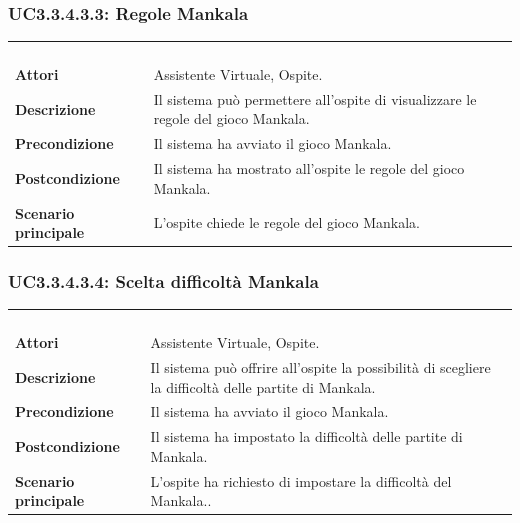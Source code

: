 \subsubsection{UC3.3.4.3.3: Regole Mankala}
\label{UC3.3.4.3.3}
\begin{longtable}{l|p{10cm}}
\rowcolor[gray]{0.8} \multicolumn{2}{c}{} \\
\rowcolor[gray]{0.8} \multicolumn{2}{c}{\textbf{UC3.3.4.3.3 - Regole Mankala}} \\
\rowcolor[gray]{0.8} \multicolumn{2}{c}{} \\
\hline
&\\
\textbf{Attori} & Assistente Virtuale, Ospite.\\[7pt]
\textbf{Descrizione} & Il sistema può permettere all'ospite di visualizzare le regole del gioco Mankala.\\[7pt]
\textbf{Precondizione} & Il sistema ha avviato il gioco Mankala.\\[7pt]
\textbf{Postcondizione} & Il sistema ha mostrato all'ospite le regole del gioco Mankala.\\[7pt]
\textbf{Scenario principale} &L'ospite chiede le regole del gioco Mankala.\\[7pt]\hline
\end{longtable}

\subsubsection{UC3.3.4.3.4: Scelta difficoltà Mankala}
\label{UC3.3.4.3.4}
\begin{longtable}{l|p{10cm}}
\rowcolor[gray]{0.8} \multicolumn{2}{c}{} \\
\rowcolor[gray]{0.8} \multicolumn{2}{c}{\textbf{UC3.3.4.3.4 - Scelta difficoltà Mankala}} \\
\rowcolor[gray]{0.8} \multicolumn{2}{c}{} \\
\hline
&\\
\textbf{Attori} & Assistente Virtuale, Ospite.\\[7pt]
\textbf{Descrizione} & Il sistema può offrire all'ospite la possibilità di scegliere la difficoltà delle partite di Mankala.\\[7pt]
\textbf{Precondizione} & Il sistema ha avviato il gioco Mankala.\\[7pt]
\textbf{Postcondizione} & Il sistema ha impostato la difficoltà delle partite di Mankala.\\[7pt]
\textbf{Scenario principale} &L'ospite ha richiesto di impostare la difficoltà del Mankala..\\[7pt]\hline
\end{longtable}

